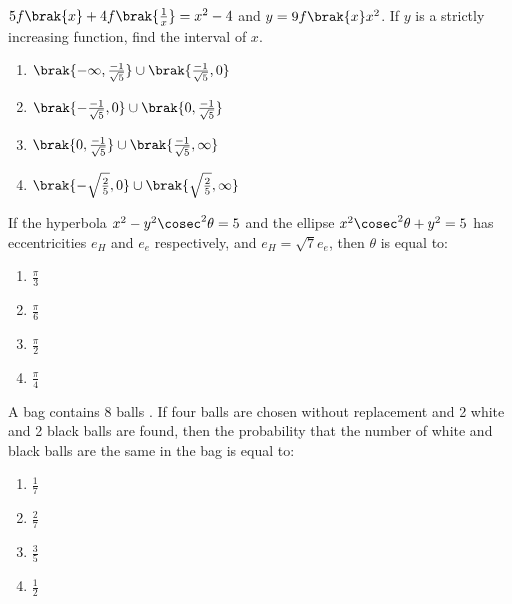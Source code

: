 \item $5f\brak{x} + 4f\brak{\frac{1}{x}} = x^2 -4$ and $y = 9f\brak{x}x^2$. If $y$ is a strictly increasing function, find the interval of $x$.  \hfill {}
\begin{multicols}{2}
\begin{enumerate}
    \item $\brak{ -\infty, \frac{-1}{\sqrt{5}} } \cup \brak{ \frac{-1}{\sqrt{5}}, 0 }$
    \item $\brak{-\frac{-1}{\sqrt{5}},0} \cup \brak{0, \frac{-1}{\sqrt{5}}}$
    \item $\brak{0, \frac{-1}{\sqrt{5}}} \cup \brak{\frac{-1}{\sqrt{5}},\infty}$
    \item $\brak{-\sqrt{\frac{2}{5}}, 0} \cup \brak{\sqrt{\frac{2}{5}}, \infty}$
\end{enumerate}
\end{multicols}


\item If the hyperbola $x^2 - y^2 \cosec^2 \theta = 5$ and the ellipse $x^2 \cosec^2 \theta + y^2 = 5$ has eccentricities $e_H$ and $e_e$ respectively, and $e_H =  \sqrt{7}{e_e}$, then $\theta$ is equal to:  \hfill {}

\begin{multicols}{4}
\begin{enumerate}
    \item $\frac{\pi}{3}$
    \item $\frac{\pi}{6}$
    \item $\frac{\pi}{2}$
    \item $\frac{\pi}{4}$
\end{enumerate}
\end{multicols}

\item A bag contains 8 balls . If four balls are chosen without replacement and 2 white  and 2 black  balls are found, then the probability that the number of white and black balls are the same in the bag is equal to: \hfill {}


\begin{multicols}{4}
\begin{enumerate}
    \item $\frac{1}{7}$
    \item $\frac{2}{7}$
    \item $\frac{3}{5}$
    \item $\frac{1}{2}$
\end{enumerate}
\end{multicols}


